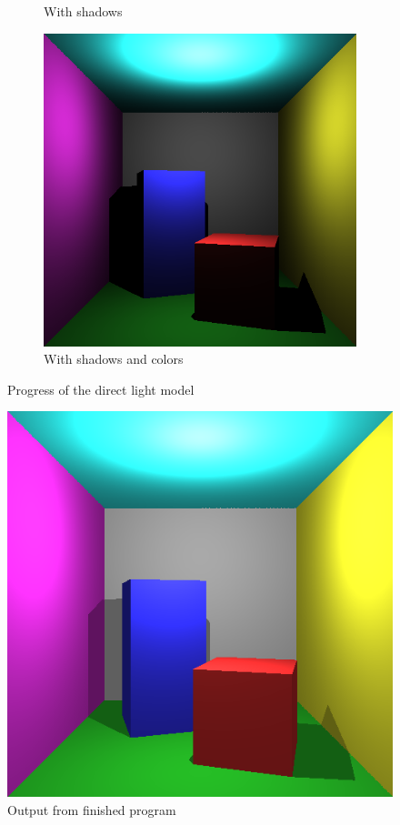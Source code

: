 \documentclass[a4paper,11pt]{article}
\begin{document}
\begin{figure}[h!]
\begin{subfigure}[h!]{0.3\linewidth}
		\caption{With shadows}
		\label{fig3}
	\end{subfigure}
	\begin{subfigure}[h!]{0.3\linewidth}
		\centering
		\includegraphics[width=\linewidth]{screenshot3.png}
		\caption{With shadows and colors}
		\label{fig4}
	\end{subfigure}
	\caption{Progress of the direct light model}
\end{figure}

\begin{figure}[h!]
	\centering	
	\includegraphics[width=0.45\linewidth]{screenshot4.png}
	\caption{Output from finished program}
	\label{fig5}
\end{figure}
\end{document}
